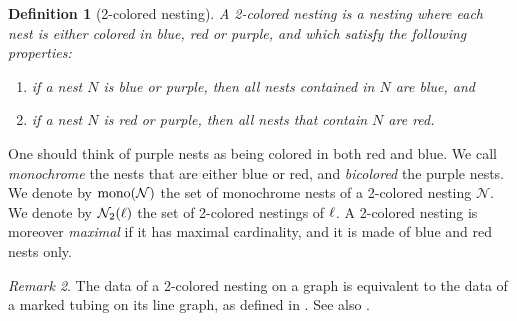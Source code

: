 \documentclass[twoside, 11pt]{amsart}
\newtheorem{definition}{Definition}[section]
\theoremstyle{remark}
\newtheorem{remark}[definition]{\sc Remark}
\begin{document}
\begin{definition}[2-colored nesting] 
A \emph{2-colored nesting} is a nesting where each nest is either colored in blue, red or purple, and which satisfy the following properties: 
\begin{enumerate}[leftmargin=*]
\item if a nest $N$ is blue or purple, then all nests contained in $N$ are blue, and 
\item if a nest $N$ is red or purple, then all nests that contain $N$ are red.
\end{enumerate}
\end{definition}
One should think of purple nests as being colored in both red and blue. 
We call \emph{monochrome} the nests that are either blue or red, and \emph{bicolored} the purple nests. 
We denote by $\mathrm{mono}(\mathcal{N})$ the set of monochrome nests of a 2-colored nesting $\mathcal{N}$.
We denote by $\mathcal{N}_2(\ell)$ the set of 2-colored nestings of $\ell$.
A 2-colored nesting is moreover \emph{maximal} if it has maximal cardinality, and it is made of blue and red nests only. 

\begin{remark} 
The data of a 2-colored nesting on a graph is equivalent to the data of a marked tubing on its line graph, as defined in \cite{DevadossForcey08}. See also \cite[Remark 2.4]{LA21}.
\end{remark}
\end{document}
